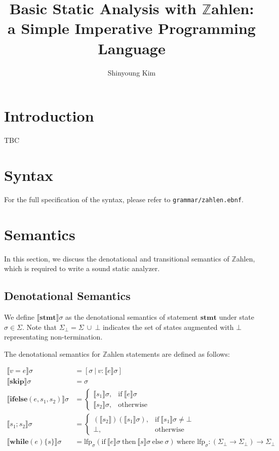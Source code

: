 \documentclass{article}
\title{Basic Static Analysis with $\mathbb{Z}$ahlen: a Simple Imperative Programming Language}
\author{Shinyoung Kim}
\date{}
\begin{document}
	\maketitle
	
	\section{Introduction}
	TBC
	
	\section{Syntax}
	
	For the full specification of the syntax, please refer to \texttt{grammar/zahlen.ebnf}.
	
	\section{Semantics}
	
	In this section, we discuss the denotational and transitional semantics of $\mathbb{Z}$ahlen, which is required to write a sound static analyzer.
	
	\subsection{Denotational Semantics}
	
	We define $\llbracket \mathbf{stmt} \rrbracket \sigma$ as the denotational semantics of statement $\mathbf{stmt}$ under state $\sigma \in \Sigma$. Note that $\Sigma_{\bot} = \Sigma \ \cup \ \bot$ indicates the set of states augmented with $\bot$ representating non-termination.
	
	The denotational semantics for $\mathbb{Z}$ahlen statements are defined as follows:
	
	\begin{align*}
			\llbracket v = e \rrbracket \sigma &= [\sigma \ | \ v: \llbracket e \rrbracket \sigma] \\
			\llbracket \mathbf{skip} \rrbracket \sigma &= \sigma
			\\
			\llbracket \mathbf{ifelse}(e, s_1, s_2) \rrbracket \sigma &=
			\begin{cases}
				\llbracket s_1 \rrbracket \sigma, & \text{if} \ \llbracket e \rrbracket \sigma \\
				\llbracket s_2 \rrbracket \sigma, & \text{otherwise}
			\end{cases} \\
			\llbracket s_1 ; s_2 \rrbracket \sigma &=
			\begin{cases}
				(\llbracket s_2 \rrbracket)(\llbracket s_1 \rrbracket \sigma), & \text{if} \ \llbracket s_1 \rrbracket \sigma \neq \bot \\
				\bot, & \text{otherwise}
			\end{cases} \\
			\llbracket \mathbf{while} (e) \{ s \} \rrbracket \sigma &= \text{lfp}_{\sigma}(\text{if} \ \llbracket e \rrbracket \sigma \  \text{then} \ \llbracket s \rrbracket \sigma \ \text{else} \  \sigma) \ \text{where } \text{lfp}_{\sigma}: (\Sigma_{\bot} \to \Sigma_{\bot}) \to \Sigma_{\bot}
	\end{align*}
	
\end{document}
